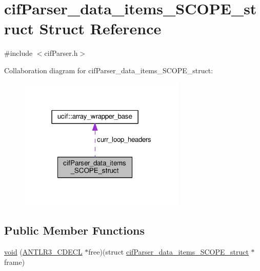 \hypertarget{structcif_parser__data__items___s_c_o_p_e__struct}{\section{cif\-Parser\-\_\-data\-\_\-items\-\_\-\-S\-C\-O\-P\-E\-\_\-struct Struct Reference}
\label{structcif_parser__data__items___s_c_o_p_e__struct}
}


{\ttfamily \#include $<$cif\-Parser.\-h$>$}



Collaboration diagram for cif\-Parser\-\_\-data\-\_\-items\-\_\-\-S\-C\-O\-P\-E\-\_\-struct\-:
\nopagebreak
\begin{figure}[H]
\begin{center}
\leavevmode
\includegraphics[width=226pt]{structcif_parser__data__items___s_c_o_p_e__struct__coll__graph}
\end{center}
\end{figure}
\subsection*{Public Member Functions}
\begin{DoxyCompactItemize}
\item 
\hyperlink{structcif_parser__data__items___s_c_o_p_e__struct_ae65c9ff94f39c0a996db62ad6cdb8157}{void} (\hyperlink{antlr3defs_8h_a91c919dd260a95cc88a0cd9b5c0a11cc}{A\-N\-T\-L\-R3\-\_\-\-C\-D\-E\-C\-L} $\ast$free)(struct \hyperlink{structcif_parser__data__items___s_c_o_p_e__struct}{cif\-Parser\-\_\-data\-\_\-items\-\_\-\-S\-C\-O\-P\-E\-\_\-struct} $\ast$frame)
\end{DoxyCompactItemize}
